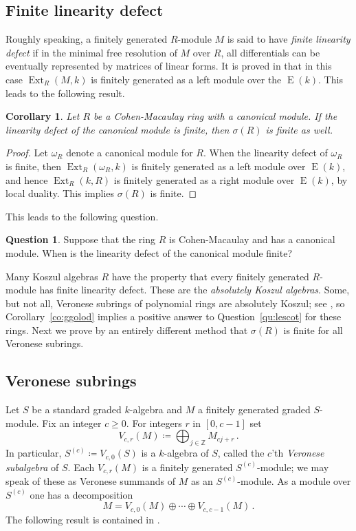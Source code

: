 \documentclass{amsart}
\numberwithin{equation}{section}
\theoremstyle{plain}
\newtheorem{corollary}[equation]{Corollary}
\theoremstyle{definition}
\newtheorem{question}[equation]{Question}
\theoremstyle{remark}
\newcommand{\bbZ}{\mathbb{Z}}
\newcommand{\eee}{\operatorname{E}}
\newcommand{\ext}{\operatorname{Ext}}
\begin{document}
\subsection*{Finite linearity defect}
Roughly speaking, a finitely generated  $R$-module $M$ is said to have \emph{finite linearity defect} if in the minimal free resolution of $M$ over $R$, all differentials can be eventually represented by matrices of linear forms. It is proved in \cite{Herzog/Iyengar:2005} that in this case $\ext_R(M,k)$ is finitely generated as a left module over the $\eee(k)$. This leads to the following result.

\begin{corollary}
\label{co:linearity-defect}
Let $R$ be a Cohen-Macaulay ring with a canonical module. If the linearity defect of the canonical module is finite, then $\sigma(R)$ is finite as well.
\end{corollary}

\begin{proof}
Let $\omega_R$ denote a canonical module for $R$. When the linearity defect of $\omega_R$ is finite, then $\ext_R(\omega_R,k)$ is finitely generated as a left module over $\eee(k)$, and hence $\ext_R(k,R)$ is finitely generated as a right module over $\eee(k)$, by local duality. This implies $\sigma(R)$ is finite.
\end{proof}

This leads to the following question.

\begin{question}
Suppose that the ring $R$ is Cohen-Macaulay and has a canonical module. When is the linearity defect of the canonical module finite?
\end{question}

 Many Koszul algebras $R$ have the property that every finitely generated $R$-module  has finite linearity defect. These are the \emph{absolutely Koszul algebras}. Some, but not all, Veronese subrings of polynomial rings are absolutely Koszul; see \cite[Section~5]{Conca/Iyengar/Hop/Romer:2015}, so Corollary~\ref{co:ggolod} implies a positive answer to Question~\ref{qu:lescot} for these rings. Next we prove by an entirely different method that $\sigma(R)$ is finite for all Veronese subrings.

\subsection*{Veronese subrings}
Let $S$ be a standard graded $k$-algebra and $M$ a finitely generated graded $S$-module. Fix an integer $c\ge 0$. For integers $r$ in $[0,c-1]$ set 
    \[
    V_{c,r}(M)\coloneqq \bigoplus_{j\in \bbZ} M_{cj+r}\,.
    \]
 In particular, $S^{(c)}\coloneqq V_{c,0}(S)$ is a $k$-algebra of $S$, called the $c$'th \emph{Veronese subalgebra} of $S$. Each $V_{c,r}(M)$ is a finitely generated $S^{(c)}$-module; we may speak of these as Veronese summands of $M$ as an $S^{(c)}$-module. As a module over $S^{(c)}$ one has a decomposition
\[
M = V_{c,0}(M)\oplus \cdots \oplus V_{c,c-1}(M)\,.
\]
The following result is contained in \cite[Proposition~2.2]{Polishchuk/Positselski:2005}.
\end{document}
